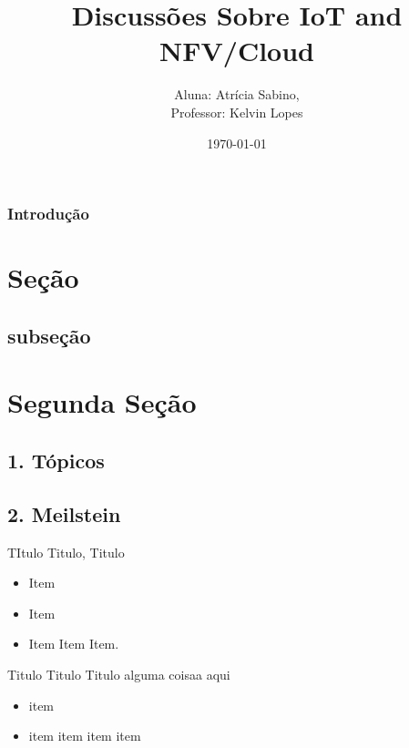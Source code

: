 \documentclass[xcolor=dvipsnames]{beamer}
\title[Sub Tema]{Discussões Sobre IoT and NFV/Cloud}
\author[www.cin.ufpe.br/masm2]{Aluna: Atrícia Sabino,  \\ Professor: Kelvin Lopes}
\date{\today}
\begin{document}
\begin{frame}
  \titlepage
\end{frame}



\begin{frame}
\frametitle{Introdução}
\tableofcontents
\end{frame}

	\section{Seção}
    	\subsection{subseção}
        
    	
    \section{Segunda Seção}
    
    	\subsection{1. Tópicos}
    
   		\subsection{2. Meilstein}
        
		\begin{frame}{TItulo Titulo, Titulo}
        \begin{itemize}
		\item Item
        \item Item
        \item Item Item Item.
        \end{itemize}
		\end{frame}
  
  
        
        \begin{frame}{Titulo Titulo Titulo}
        alguma coisaa aqui\\
        \begin{itemize}
		\item item
		\item item item item item 
		\end{itemize}
		\end{frame}
        
\end{document}
